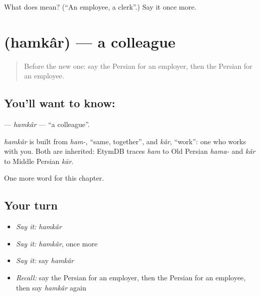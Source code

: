 \begin{tcolorbox}[breakable,colback=teal!4,colframe=teal!35!black,title={Before you move on}]
What does  mean? (\textquotedblleft{}An employee, a clerk\textquotedblright{}.) Say it once more.
\end{tcolorbox}
\section[\texorpdfstring{\fa{همکار} (hamkâr)}{همکار (hamkâr)}]{ (hamkâr) — a colleague}

\label{lesson:FA-C214-hamkar}



\begin{quote}
Before the new one: say the Persian for an employer, then the Persian for an employee.
\end{quote}

\subsection*{You'll want to know: }
\textbf{} — \emph{hamkâr} — \textquotedblleft{}a colleague\textquotedblright{}.

\begin{cousinweb}
\emph{hamkâr} is built from \emph{ham-}, \textquotedblleft{}same, together\textquotedblright{}, and \emph{kâr}, \textquotedblleft{}work\textquotedblright{}: one who works with you. Both are inherited: EtymDB traces \emph{ham} to Old Persian \emph{hama-} and \emph{kâr} to Middle Persian \emph{kār}.
\end{cousinweb}

\begin{grammarlens}[title={What you've built}]
One more word for this chapter.
\end{grammarlens}

\subsection*{Your turn}
\begin{itemize}
\raggedright
  \item \emph{Say it:} \emph{hamkâr}
  \item \emph{Say it:} \emph{hamkâr}, once more
  \item \emph{Say it:} say \emph{hamkâr}
  \item \emph{Recall:} say the Persian for an employer, then the Persian for an employee, then say \emph{hamkâr} again
\end{itemize}

